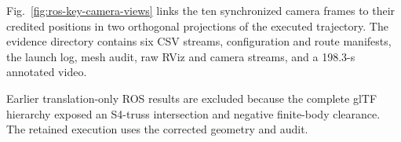 Fig.~\ref{fig:ros-key-camera-views} links the ten synchronized camera frames
to their credited positions in two orthogonal projections of the executed trajectory.
The evidence directory contains six CSV streams, configuration and route manifests,
the launch log, mesh audit, raw RViz and camera streams, and a 198.3-s annotated video.

Earlier translation-only ROS results are excluded because the complete glTF
hierarchy exposed an S4-truss intersection and negative finite-body clearance.
The retained execution uses the corrected geometry and audit.
